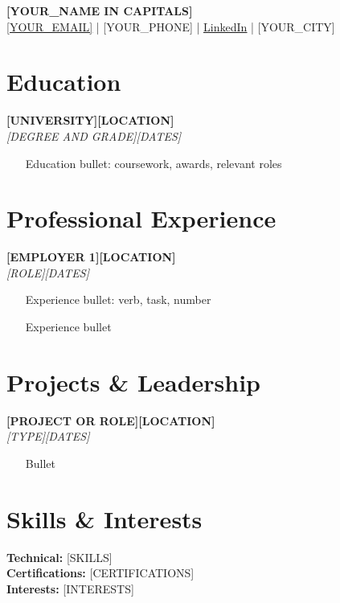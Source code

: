 \documentclass[10pt,a4paper]{article}
\newcommand{\link}[2]{\href{#1}{\textcolor{linkblue}{\underline{#2}}}}
\newcommand{\entry}[4]{\vspace{3pt}\noindent\textbf{#1}\hfill\textbf{#2}\\\noindent\textit{#3}\hfill\textit{#4}\par\vspace{1pt}}
\begin{document}
\begin{center}
{\fontsize{24}{28}\selectfont\bfseries [YOUR_NAME IN CAPITALS]}\\[3pt]
\link{mailto:[YOUR_EMAIL]}{[YOUR_EMAIL]} | [YOUR_PHONE] | \link{[YOUR_LINKEDIN_URL]}{LinkedIn} | [YOUR_CITY]
\end{center}

\section{Education}
\entry{[UNIVERSITY]}{[LOCATION]}{[DEGREE AND GRADE]}{[DATES]}
\begin{itemize}
\item [Education bullet: coursework, awards, relevant roles]
\end{itemize}

\section{Professional Experience}
\entry{[EMPLOYER 1]}{[LOCATION]}{[ROLE]}{[DATES]}
\begin{itemize}
\item [Experience bullet: verb, task, number]
\item [Experience bullet]
\end{itemize}

\section{Projects \& Leadership}
\entry{[PROJECT OR ROLE]}{[LOCATION]}{[TYPE]}{[DATES]}
\begin{itemize}
\item [Bullet]
\end{itemize}

\section{Skills \& Interests}
\vspace{2pt}
\textbf{Technical:} [SKILLS]\\
\textbf{Certifications:} [CERTIFICATIONS]\\
\textbf{Interests:} [INTERESTS]
\end{document}
